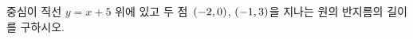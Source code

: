 중심이 직선 $y=x+5$ 위에 있고 두 점~$(-2{,}\mkern3mu\mathopen{}0)$, $(-1{,}\mkern3mu\mathopen{}3)$을 지나는 원의 반지름의 길이를 구하시오.
